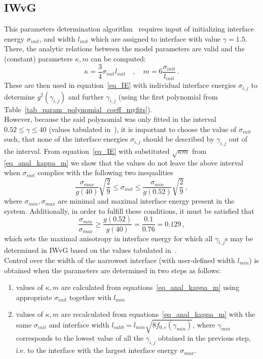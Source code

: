 \subsection{IWvG}
This parameters determination algorithm~\cite{Ravash2017} requires input of initializing interface energy $\sigma_{init}$, and width $l_{init}$ which are assigned to interface with value $\gamma=1.5$. There, the analytic relations between the model parameters are valid and the (constant) parameters $\kappa,m$ can be computed:
\begin{equation}\label{eq_anal_kappa_m}
	\kappa = \frac{3}{4}\sigma_{init}l_{init} \quad ,\quad m = 6\frac{\sigma_{init}}{l_{init}} \,.
\end{equation}
These are then used in equation~\eqref{eq_IE} with individual interface energies $\sigma_{i,j}$ to determine $g^2(\gamma_{i,j})$ and further $\gamma_{i,j}$ (using the first polynomial from Table~\ref{tab_param_polynomial_coeff_myfits}).\\
However, because the said polynomial was only fitted in the interval $0.52\leq\gamma\leq 40$ (values tabulated in~\cite{Ravash2017}), it is important to choose the value of $\sigma_{init}$ such, that none of the interface energies $\sigma_{i,j}$ should be described by $\gamma_{i,j}$ out of the interval. From equation~\eqref{eq_IE} with substituted $\sqrt{\kappa m}$ from \ref{eq_anal_kappa_m} we show that the values do not leave the above interval when $\sigma_{init}$ complies with the following two inequalities
\begin{equation}
	\frac{\sigma_{max}}{g(40)}\sqrt{\frac{2}{9}}\leq \sigma_{init}\leq \frac{\sigma_{min}}{g(0.52)}\sqrt{\frac{2}{9}} \,,
\end{equation}
where $\sigma_{min},\sigma_{max}$ are minimal and maximal interface energy present in the system. Additionally, in order to fulfill these conditions, it must be satisfied that
\begin{equation}
	\frac{\sigma_{min}}{\sigma_{max}} \geq \frac{g(0.52)}{g(40)} = \frac{0.1}{0.76} = 0.129 \,,
\end{equation}
which sets the maximal anisotropy in interface energy for which all $\gamma_{i,j}$s may be determined in IWvG based on the values tabulated in~\cite{Ravash2017}.\\
Control over the width of the narrowest interface (with user-defined width $l_{min}$) is obtained when the parameters are determined in two steps as follows:
\begin{enumerate}
	\item values of $\kappa,m$ are calculated from equations~\eqref{eq_anal_kappa_m} using appropriate $\sigma_{init}$ together with $l_{min}$
	\item values of $\kappa,m$ are recalculated from equations~\eqref{eq_anal_kappa_m} with the same $\sigma_{init}$ and interface width $l_{calib}=l_{min}\sqrt{8f_{0,c}(\gamma_{min})}$,  where $\gamma_{min}$ corresponds to the lowest value of all the $\gamma_{i,j}$ obtained in the previous step, i.e. to the interface with the largest interface energy $\sigma_{max}$. 
\end{enumerate}
